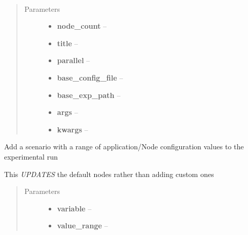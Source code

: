 \documentclass[letterpaper,10pt,english]{sphinxmanual}
\begin{document}
\begin{fulllineitems}
\label{index:polybos.ExperimentManager}~\begin{quote}\begin{description}
\item[{Parameters}] \leavevmode\begin{itemize}
\item {} 
\textbf{node\_count} -- 

\item {} 
\textbf{title} -- 

\item {} 
\textbf{parallel} -- 

\item {} 
\textbf{base\_config\_file} -- 

\item {} 
\textbf{base\_exp\_path} -- 

\item {} 
\textbf{args} -- 

\item {} 
\textbf{kwargs} -- 

\end{itemize}

\end{description}\end{quote}

\begin{fulllineitems}
\label{index:polybos.ExperimentManager.add_application_variable_scenario}
Add a scenario with a range of application/Node configuration values to the
experimental run

This \emph{UPDATES} the default nodes rather than adding custom ones
\begin{quote}\begin{description}
\item[{Parameters}] \leavevmode\begin{itemize}
\item {} 
\textbf{variable} -- 

\item {} 
\textbf{value\_range} -- 


\end{itemize}
\end{description}
\end{quote}
\end{fulllineitems}
\end{fulllineitems}
\end{document}
